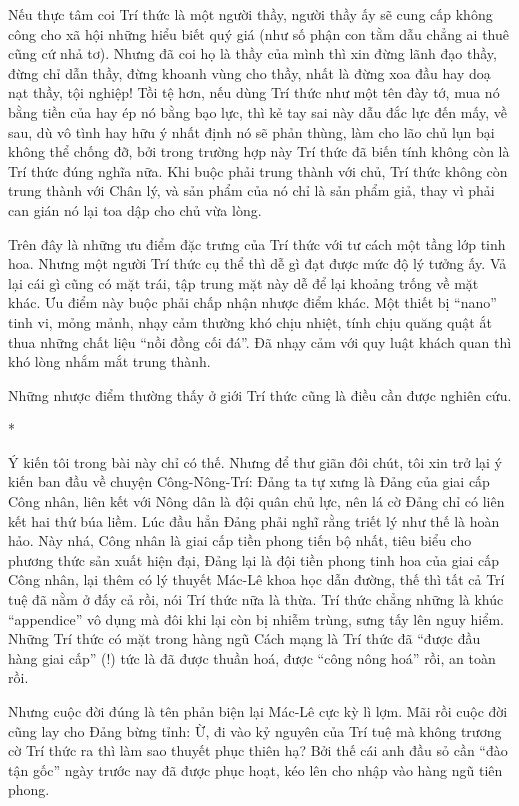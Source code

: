 Nếu thực tâm coi Trí thức là một người thầy, người thầy ấy sẽ cung cấp không công cho xã hội những hiểu biết quý giá (như số phận con tằm dẫu chẳng ai thuê cũng cứ nhả tơ). Nhưng đã coi họ là thầy của mình thì xin đừng lãnh đạo thầy, đừng chỉ dẫn thầy, đừng khoanh vùng cho thầy, nhất là đừng xoa đầu hay doạ nạt thầy, tội nghiệp! Tồi tệ hơn, nếu dùng Trí thức như một tên đày tớ, mua nó bằng tiền của hay ép nó bằng bạo lực, thì kẻ tay sai này dẫu đắc lực đến mấy, về sau, dù vô tình hay hữu ý nhất định nó sẽ phản thùng, làm cho lão chủ lụn bại không thể chống đỡ, bởi trong trường hợp này Trí thức đã biến tính không còn là Trí thức đúng nghĩa nữa. Khi buộc phải trung thành với chủ, Trí thức không còn trung thành với Chân lý, và sản phẩm của nó chỉ là sản phẩm giả, thay vì phải can gián nó lại toa dập cho chủ vừa lòng.

Trên đây là những ưu điểm đặc trưng của Trí thức với tư cách một tầng lớp tinh hoa. Nhưng một người Trí thức cụ thể thì dễ gì đạt được mức độ lý tưởng ấy. Vả lại cái gì cũng có mặt trái, tập trung mặt này dễ để lại khoảng trống về mặt khác. Ưu điểm này buộc phải chấp nhận nhược điểm khác. Một thiết bị “nano” tinh vi, mỏng mảnh, nhạy cảm thường khó chịu nhiệt, tính chịu quăng quật ắt thua những chất liệu “nồi đồng cối đá”. Đã nhạy cảm với quy luật khách quan thì khó lòng nhắm mắt trung thành.

Những nhược điểm thường thấy ở giới Trí thức cũng là điều cần được nghiên cứu.

*

Ý kiến tôi trong bài này chỉ có thế. Nhưng để thư giãn đôi chút, tôi xin trở lại ý kiến ban đầu về chuyện Công-Nông-Trí: Đảng ta tự xưng là Đảng của giai cấp Công nhân, liên kết với Nông dân là đội quân chủ lực, nên lá cờ Đảng chỉ có liên kết hai thứ búa liềm. Lúc đầu hẳn Đảng phải nghĩ rằng triết lý như thế là hoàn hảo. Này nhá, Công nhân là giai cấp tiền phong tiến bộ nhất, tiêu biểu cho phương thức sản xuất hiện đại, Đảng lại là đội tiền phong tinh hoa của giai cấp Công nhân, lại thêm có lý thuyết Mác-Lê khoa học dẫn đường, thế thì tất cả Trí tuệ đã nằm ở đấy cả rồi, nói Trí thức nữa là thừa. Trí thức chẳng những là khúc “appendice” vô dụng mà đôi khi lại còn bị nhiễm trùng, sưng tấy lên nguy hiểm. Những Trí thức có mặt trong hàng ngũ Cách mạng là Trí thức đã “được đầu hàng giai cấp” (!) tức là đã được thuần hoá, được “công nông hoá” rồi, an toàn rồi.

Nhưng cuộc đời đúng là tên phản biện lại Mác-Lê cực kỳ lì lợm. Mãi rồi cuộc đời cũng lay cho Đảng bừng tỉnh: Ừ, đi vào kỷ nguyên của Trí tuệ mà không trương cờ Trí thức ra thì làm sao thuyết phục thiên hạ? Bởi thế cái anh đầu sỏ cần “đào tận gốc” ngày trước nay đã được phục hoạt, kéo lên cho nhập vào hàng ngũ tiên phong.


